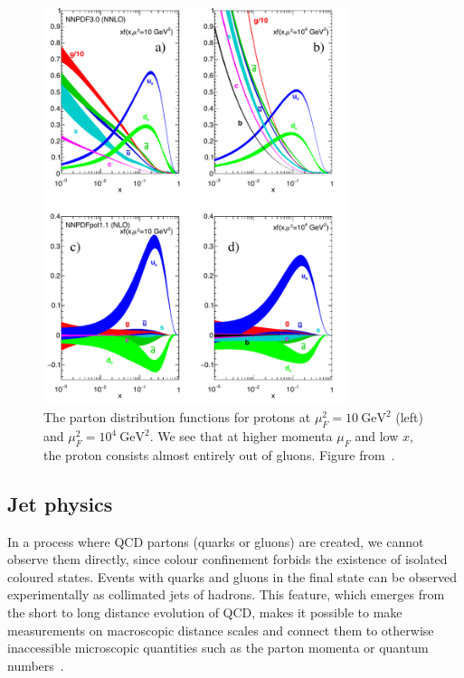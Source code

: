 \begin{figure}
\begin{centering}
\includegraphics[width=0.8\textwidth]{figures/theory/pdf.pdf}
\caption[The parton distribution functions for protons.]{The parton distribution functions for protons at $\mu_F^2 = 10~\mathrm{GeV}^2$ (left) and $\mu_F^2 = 10^4~\mathrm{GeV}^2$. We see that at higher momenta $\mu_F$ and low $x$, the proton consists almost entirely out of gluons. Figure from~\cite{Patrignani:2016xqp}.}
\label{fig:proton_pdf}
\end{centering}
\end{figure}

\subsection{Jet physics}
In a process where QCD partons (quarks or gluons) are created, we cannot observe them directly, since colour confinement forbids the existence of isolated coloured states. Events with quarks and gluons in the final state can be observed experimentally as collimated jets of hadrons. This feature, which emerges from the short to long distance evolution of QCD, makes it possible to make measurements on macroscopic distance scales and connect them to otherwise inaccessible microscopic quantities such as the parton momenta or quantum numbers~\cite{Sterman:1977wj}.

